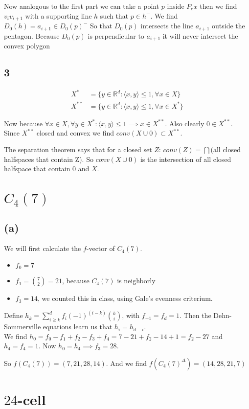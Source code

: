 \documentclass[paper=a4, fontsize=11pt]{scrartcl} %
\theoremstyle{plain}
\begin{document}
Now analogous to the first part we can take a point $p$ inside $P_ex$ then we find $v_{i}v_{i+1}$ with a supporting line $h$ such that $p\in h^-$. We find $D_0(h)=a_{i+1}\in D_0(p)^-$ So that $D_0(p)$ intersects the line $a_{i+1}$ outside the pentagon. Because $D_0(p)$ is perpendicular to $a_{i+1}$ it will never intersect the convex polygon

\subsection{3}
\begin{align*}
X^{*} &= \{y\in \mathbb{R}^{d} : \langle x,y\rangle \leq 1, \forall x \in X\}\\
X^{**} &= \{y\in \mathbb{R}^{d} : \langle x,y\rangle \leq 1, \forall x \in X^{*}\}
\end{align*}
 
Now because $\forall x\in X,\forall y \in X^{*} : \langle x,y\rangle \leq 1 \implies x\in X^{**}$. Also clearly $0\in X^{**}$. Since $X^{**}$ closed and convex we find $conv(X\cup 0)\subset X^{**}$.

The separation theorem says that for a closed set $Z$: $conv(Z)=\bigcap$(all closed halfspaces that contain Z).
So $conv(X\cup 0)$ is the intersection of all closed halfspace that contain $0$ and $X$.

\section{$C_4(7)$}
\subsection{(a)}
We will first calculate the $f$-vector of $C_4(7)$.
\begin{itemize}
\item $f_0=7$
\item $f_1= \binom{7}{2} = 21$, because $C_4(7)$ is neighborly
\item $f_3 = 14$, we counted this in class, using Gale's evenness criterium.
\end{itemize}

Define $h_k = \sum_{i\geq k}^{d} f_{i}(-1)^{(i-k)}\binom{k}{i} $, with $f_{-1}=f_{d}=1$. Then the Dehn-Sommerville equations learn us that $h_i=h_{d-i}$.\\
We find $h_0=f_0-f_1+f_2-f_3+f_4=7-21+f_2-14+1=f_2-27$ and $h_4=f_4=1$. Now $h_0=h_4\implies f_3=28$.

So $f(C_4(7))=(7,21,28,14)$. And we find $f(C_4(7)^\Delta)=(14,28,21,7)$
\section{$24$-cell}
\end{document}
